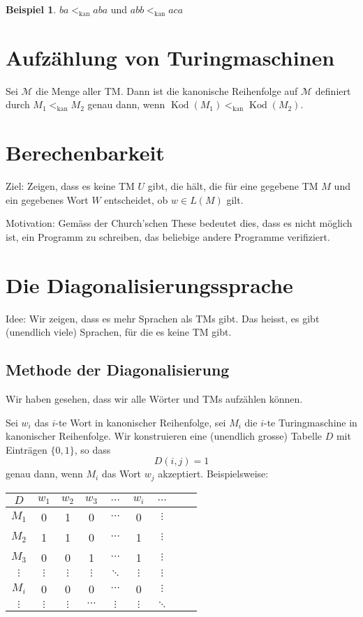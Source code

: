 \documentclass[11pt]{article} %
\theoremstyle{definition}
\newtheorem*{beispiel}{Beispiel}
\begin{document}
\begin{beispiel}
$ba <_{\textrm{kan}} aba$ und $abb <_{\textrm{kan}} aca$
\end{beispiel}

\section{Aufzählung von Turingmaschinen}

Sei $\mathcal{M}$ die Menge aller TM. Dann ist die kanonische Reihenfolge auf $\mathcal{M}$ definiert durch $M_1 <_\textrm{kan} M_2$ genau dann, wenn $\operatorname{Kod}(M_1) <_\textrm{kan} \operatorname{Kod}(M_2)$.

\section{Berechenbarkeit}

Ziel: Zeigen, dass es keine TM $U$ gibt, die hält, die für eine gegebene TM $M$ und ein gegebenes Wort $W$ entscheidet, ob $w \in L(M)$ gilt.

Motivation: Gemäss der Church'schen These bedeutet dies, dass es nicht möglich ist, ein Programm zu schreiben, das beliebige andere Programme verifiziert.

\section{Die Diagonalisierungssprache}

Idee: Wir zeigen, dass es mehr Sprachen als TMs gibt. Das heisst, es gibt (unendlich viele) Sprachen, für die es keine TM gibt.

\subsection{Methode der Diagonalisierung}

Wir haben gesehen, dass wir alle Wörter und TMs aufzählen können.

Sei $w_i$ das $i$-te Wort in kanonischer Reihenfolge, sei $M_i$ die $i$-te Turingmaschine in kanonischer Reihenfolge. Wir konstruieren eine (unendlich grosse) Tabelle $D$ mit Einträgen $\{0,1\}$, so dass
\[
D(i,j) = 1
\]
genau dann, wenn $M_i$ das Wort $w_j$ akzeptiert. Beispielsweise:

\begin{center}
\begin{tabular}{c|cccccccc}
\toprule
$D$ & $w_1$ &  $w_2$ & $w_3$ & $\dots$ & $w_i$ & $\dots$ \\
\midrule
$M_1$ & 0 & 1 & 0 &$\cdots$& 0 & $\vdots$ \\
$M_2$ & 1 & 1 & 0 &$\cdots$& 1 & $\vdots$ \\
$M_3$ & 0 & 0 & 1 &$\cdots$& 1 & $\vdots$ \\
$\vdots$ & $\vdots$ & $\vdots$ & $\vdots$ & $\ddots$ & $\vdots$ & $\vdots$\\
$M_i$ & 0 & 0 & 0 & $\cdots$ & 0 & $\vdots$ \\
$\vdots$ & $\vdots$ & $\vdots$ & $\cdots$ & $\vdots$ & $\vdots$ & $\ddots$ \\
\bottomrule
\end{tabular}
\end{center}
\end{document}
